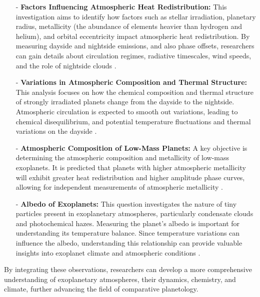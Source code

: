 \documentclass[12pt]{article}
\begin{document}
\begin{itemize}
    \item[-] \textbf{Factors Influencing Atmospheric Heat Redistribution:} This investigation aims to identify how factors such as stellar irradiation, planetary radius, metallicity (the abundance of elements heavier than hydrogen and helium), and orbital eccentricity
    impact atmospheric heat redistribution. By measuring dayside and nightside emissions, and also phase offsets, researchers can gain details about circulation regimes, radiative timescales, wind speeds, and the role of nightside clouds \cite{arielstudyreport}.
    \item[-] \textbf{Variations in Atmospheric Composition and Thermal Structure:} This analysis focuses on how the chemical composition and thermal structure of strongly irradiated planets change from the dayside to the nightside. Atmospheric circulation is expected to smooth
    out variations, leading to chemical disequilibrium, and potential temperature fluctuations and thermal variations on the dayside \cite{arielstudyreport}.
    \item[-] \textbf{Atmospheric Composition of Low-Mass Planets:} A key objective is determining the atmospheric composition and metallicity of low-mass exoplanets. It is predicted that planets with higher atmospheric metallicity will exhibit greater heat redistribution and higher
    amplitude phase curves, allowing for independent measurements of atmospheric metallicity \cite{arielstudyreport}.
    \item[-] \textbf{Albedo of Exoplanets:} This question investigates the nature of tiny particles present in exoplanetary atmospheres, particularly condensate clouds and photochemical hazes. Measuring the planet's albedo is important for understanding its temperature balance.
    Since temperature variations can influence the albedo, understanding this relationship can provide valuable insights into exoplanet climate and atmospheric conditions \cite{arielstudyreport}.
\end{itemize}

By integrating these observations, researchers can develop a more comprehensive understanding of exoplanetary atmospheres, their dynamics, chemistry, and climate, further advancing the field of comparative planetology.
\end{document}
